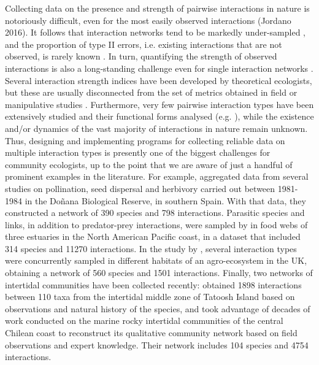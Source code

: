 Collecting data on the presence and strength of pairwise interactions in nature is notoriously difficult, even for the most easily observed interactions (Jordano 2016). It follows that interaction networks tend to be markedly under{}-sampled \citep{Chacoff2012}, and the proportion of type II errors, i.e. existing interactions that are not observed, is rarely known \citep{Olesen2011a, Morales-Castilla2015, Gravel2016}. In turn, quantifying the strength of observed interactions is also a long-standing challenge even for single interaction networks \citep{Berlow2004}. Several interaction strength indices have been developed by theoretical ecologists, but these are usually disconnected from the set of metrics obtained in field or manipulative studies \citep{Wootton2005}. Furthermore, very few pairwise interaction types have been extensively studied and their functional forms analysed (e.g. \citealt{Holland2002, Novak2008}), while the existence and/or dynamics of the vast majority of interactions in nature remain unknown. Thus, designing and implementing programs for collecting reliable data on multiple interaction types is presently one of the biggest challenges for community ecologists, up to the point that we are aware of just a handful of prominent examples in the literature. For example, \cite{Melian2009} aggregated data from several studies on pollination, seed dispersal and herbivory carried out between 1981-1984 in the Do\~nana Biological Reserve, in southern Spain. With that data, they constructed a network of 390 species and 798 interactions. Parasitic species and links, in addition to predator-prey interactions, were sampled by \cite{Hechinger2011} in food webs of three estuaries in the North American Pacific coast, in a dataset that included 314 species and 11270 interactions. In the study by \cite{Pocock2012}, several interaction types were concurrently sampled in different habitats of an agro{}-ecosystem in the UK, obtaining a network of 560 species and 1501 interactions. Finally, two networks of intertidal communities have been collected recently: \cite{Sander2015} obtained 1898 interactions between 110 taxa from the intertidal middle zone of Tatoosh Island based on observations and natural history of the species, and \cite{Kefi2015} took advantage of decades of work conducted on the marine rocky intertidal communities of the central Chilean coast to reconstruct its qualitative community network based on field observations and expert knowledge. Their network includes 104 species and 4754 interactions.

